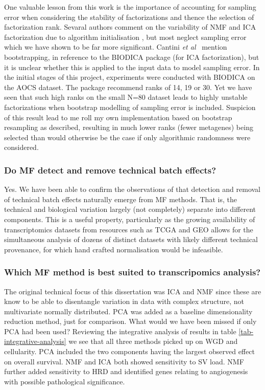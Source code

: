 \documentclass[tikz, 12pt,a4paper,oneside,fleqn]{article}
\newcommand{\etal}{{\em et al\/}}
\begin{document}
One valuable lesson from this work is the importance of accounting for sampling error  when considering the stability of factorizations and thence the selection of factorization rank.    Sevaral authors comment on the variability of NMF and ICA factorization due to algorithm initialisation \cite{Kairov2017,Sompairac2019,WayGregory2019}, but most neglect sampling error which we have shown to be far more significant.   Cantini \etal\ \cite{Cantini2019a} mention bootstrapping, in reference to the BIODICA package (for ICA factorization), but it is unclear whether this is applied to the input data to model sampling error.  In the initial stages of this project, experiments were conducted with BIODICA on the AOCS dataset.   The package recommend ranks of 14, 19 or 30.  Yet we have seen that such high ranks on the small N=80 dataset leads to highly unstable factorizations when bootstrap modelling of sampling error is included.  Suspicion of this result lead to me roll my own implementation based on bootstrap resampling as described, resulting in much lower ranks (fewer metagenes) being selected than would otherwise be the case if only algorithmic randomness were considered.

\subsubsection*{Do MF detect and remove technical batch effects?}

Yes. We have been able to confirm the observations of \cite{Zhou2018a,Renard2016,Meng2016} that detection and removal of technical  batch effects naturally emerge from MF methods.  That is, the technical and biological variation largely (not completely) separate into different components.  This is a useful property, particularly as the growing availability of transcriptomics datasets from resources such as TCGA and GEO allows for the simultaneous analysis of dozens of distinct datasets with likely different technical provenance, for which hand crafted normalisation would be infeasible.

\subsubsection*{Which MF method is best suited to transcripomics analysis?}

The original technical focus of this dissertation was ICA and NMF since these are know to be able to disentangle variation in data with complex structure, not multivariate normally distributed.  PCA was added as a baseline dimensionality reduction method, just for comparison.   What would we have been missed if only PCA had been used?  Reviewing the integrative analysis of results in table \ref{tab-integrative-analysis} we see that all three methods picked up on WGD and cellularity.  PCA included the two components having the largest observed effect on overall survival.  NMF and ICA both showed sensitivity to SV load.  NMF further added sensitivity to HRD and identified genes relating to angiogenesis with possible pathological significance.
\end{document}
